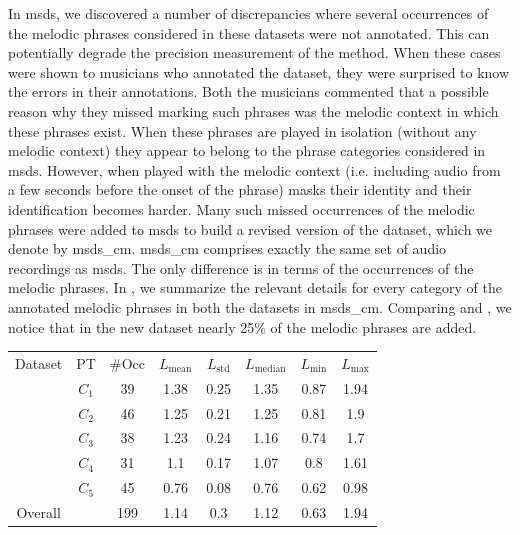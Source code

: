 {{{In \acrshort{msds}, we discovered a number of discrepancies where several occurrences of the melodic phrases considered in these datasets were not annotated. This can potentially degrade the precision measurement of the method. When these cases were shown to musicians who annotated the dataset, they were surprised to know the errors in their annotations. Both the musicians commented that a possible reason why they missed marking such phrases was the melodic context in which these phrases exist. When these phrases are played in isolation (without any melodic context) they appear to belong to the phrase categories considered in \acrshort{msds}. However, when played with the melodic context (i.e. including audio from a few seconds before the onset of the phrase) masks their identity and their identification becomes harder. Many such missed occurrences of the melodic phrases were added to \acrshort{msds} to build a revised version of the dataset, which we denote by \acrshort{msds_cm}. \acrshort{msds_cm} comprises exactly the same set of audio recordings as \acrshort{msds}. The only difference is in terms of the occurrences of the melodic phrases. In  , we summarize the relevant details for every category of the annotated melodic phrases in both the datasets in \acrshort{msds_cm}. Comparing  and , we notice that in the new dataset nearly 25\% of the melodic phrases are added.%


{\renewcommand{\arraystretch}{1.5}
	\begin{table} 
		\begin{centering}
			\begin{tabular}{ c c|c c c c c c}
				\tabletop
				Dataset	& PT 	&	\#Occ & $L_{\mathrm{mean}}$ & $L_{\mathrm{std}}$ &	$L_{\mathrm{median}}$ & $L_{\mathrm{min}}$ 	&	$L_{\mathrm{max}}$\\
				\tablemid
				\multirow{5}{*}{\acrshort{msds_cm_cmd}} 
				& $C_1$ & 39 & 1.38 & 0.25 & 1.35 & 0.87 & 1.94\\
				& $C_2$ & 46 & 1.25 & 0.21 & 1.25 & 0.81 & 1.9\\
				& $C_3$ & 38 & 1.23 & 0.24 & 1.16 & 0.74 & 1.7\\
				& $C_4$ & 31 & 1.1  & 0.17 & 1.07 & 0.8  & 1.61\\
				& $C_5$ & 45 & 0.76 & 0.08 & 0.76 & 0.62 & 0.98\\
				\tablemid
				Overall	&  	& 199& 1.14 & 0.3  & 1.12 & 0.63 & 1.94\\
				

\end{tabular}
\end{centering}
\end{table}}}}}
